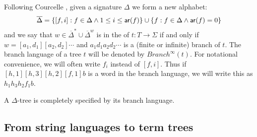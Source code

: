 Following Courcelle \cite{Cou83}, given a signature $\Delta$ we
form a new alphabet:
\begin{equation}
\nonumber \overline{\Delta} = \{[f,i] : f \in \Delta \wedge 1 \leq i
\leq {\sf ar}(f)\} \cup \{f : f \in \Delta \wedge {\sf ar}(f) = 0\}
\end{equation}
and we say that $w \in {\overline{\Delta}}^* \cup
{\overline{\Delta}}^w$ is in the  of $t:
T \rightarrow \Sigma$ if and only if $w = [a_1, d_1][a_2,d_2]
\cdots $ and $a_1d_1a_2d_2 \cdots $ is a (finite or infinite)
branch of $t$. The branch language of a tree $t$ will be denoted
by $Branch^\infty(t)$. For notational convenience, we will often write
$f_i$ instead of $[f,i]$. Thus if $[h,1][h,3][h,2][f,1]b$
is a word in the branch language, we will write this as $h_1h_3h_2f_1b$.

\begin{lemma} \cite{Cou83} A $\Delta$-tree is completely specified by its
branch language.
\end{lemma}

\subsection{From string languages to term trees}

